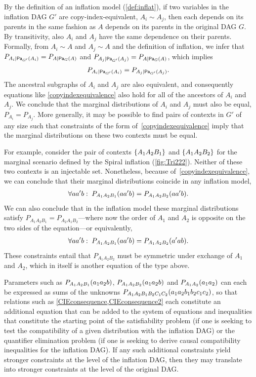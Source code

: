 \documentclass[aps,english,10pt,superscriptaddress,onecolumn,twoside,longbibliography,pra,floatfix,fleqn,nofootinbib]{revtex4-1}%
\theoremstyle{definition}
\newcounter{example}[section]
\newcommand{\p}[2][]{{P_{#1}}\parenths{#2}}
\newcommand{\pfunc}[1]{P_{#1}}
\newcommand{\Pa}[2][]{{\mathsf{Pa}_{#1}}\parenths{#2}}
\DeclarePairedDelimiter{\parenths}{\lparen}{\rparen}
\DeclarePairedDelimiter{\braces}{\lbrace}{\rbrace}
\newcommand{\brackets}[1]{\braces*{#1}}
\begin{document}
By the definition of an inflation model (\cref{def:inflat}), if two variables in the inflation DAG $G'$ are copy-index-equivalent, $A_i \sim A_j$, then each depends on its parents in the same fashion as $A$ depends on its parents in the original DAG $G$. By transitivity, also $A_i$ and $A_j$ have the same dependence on their parents.  Formally, from $A_i \sim A$ and $A_j \sim A$ and the definition of inflation, we infer that $\pfunc{A_i| \Pa[G']{A_i}}=\pfunc{A|\Pa[G]{A}}$ and $\pfunc{A_j| \Pa[G']{A_j}}=\pfunc{A|\Pa[G]{A}}$, which implies
\begin{align}\label{copyindexequivalence}
\pfunc{A_i| \Pa[G']{A_i}}=\pfunc{A_j|\Pa[G']{A_j}}.
 \end{align}
The ancestral subgraphs of $A_i$ and $A_j$ are also equivalent, and consequently equations like \cref{copyindexequivalence} also hold for all of the ancestors of $A_i$ and $A_j$. We conclude that  the marginal distributions of $A_i$ and $A_j$ must also be equal, $\pfunc{A_i}=\pfunc{A_j}$.
More generally, it may be possible to find pairs of contexts in $G'$ of any size such that constraints of the form of~\cref{copyindexequivalence} imply that the marginal distributions on these two contexts must be equal. 

For example, consider the pair of contexts $\brackets{A_1 A_2 B_1}$ and $\brackets{A_1 A_2 B_2}$ for the marginal scenario defined by the Spiral inflation (\cref{fig:Tri222}). Neither of these two contexts is an injectable set.  Nonetheless, because of~\cref{copyindexequivalence}, we can conclude that their marginal distributions coincide in any inflation model,
\begin{align}\label{CIEconsequence}
\forall{a a' b}:\;\p[A_1 A_2 B_1]{a a' b} = \p[A_1 A_2 B_2]{a a' b}.
\end{align}
We can also conclude that in the inflation model these marginal distributions satisfy  $P_{A_1 A_2 B_1}=P_{A_2 A_1 B_2}$---where now the order of $A_1$ and $A_2$ is opposite on the two sides of the equation---or equivalently, 
\begin{align}\label{CIEconsequence2}
\forall{a a' b}:\;\p[A_1 A_2 B_1]{a a' b} = \p[A_1 A_2 B_2]{a' a b}.
\end{align}
These constraints entail that $P_{A_1 A_2 B_2}$ must be symmetric under exchange of $A_1$ and $A_2$, which in itself is another equation of the type above.

Parameters such as $\p[A_1 A_2 B_1]{a_1 a_2 b}$, $\p[A_1 A_2 B_2]{a_1 a_2 b}$ and $\p[A_1 A_2]{a_1 a_2}$ can each be expressed as sums of the unknowns $\p[A_1 A_2 B_1 B_2 C_1 C_2]{a_1 a_2 b_1 b_2 c_1 c_2}$, so that relations such as \cref{CIEconsequence,CIEconsequence2} each constitute an additional equation that can be added to the system of equations and inequalities that constitute the starting point of the satisfiability problem (if one is seeking to test the compatibility of a given distribution with the inflation DAG) or the quantifier elimination problem (if one is seeking to derive causal compatibility inequalities for the inflation DAG).  If any such additional constraints yield stronger constraints at the level of the inflation DAG, then they may translate into stronger constraints at the level of the original DAG.
\end{document}
